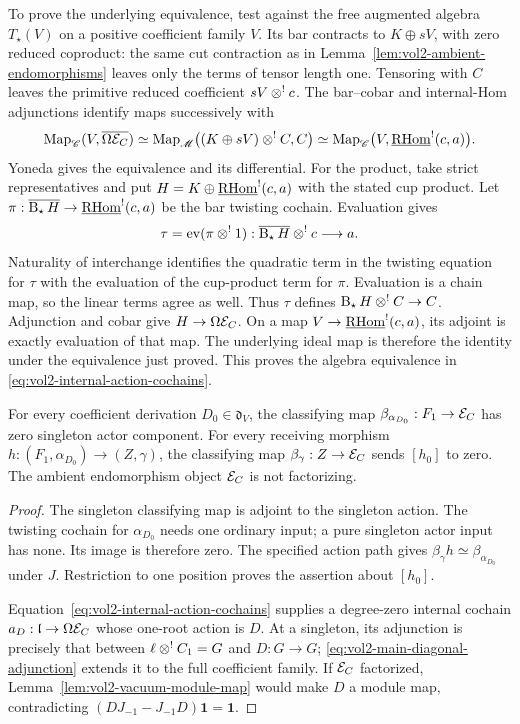 To prove the underlying equivalence, test against the free augmented
algebra $T_\star(V)$ on a positive coefficient family $V$.
Its bar contracts to $K\oplus sV$, with zero reduced coproduct:
the same cut contraction as in
Lemma~\ref{lem:vol2-ambient-endomorphisms} leaves only the
terms of tensor length one. Tensoring with $C$ leaves the primitive reduced
coefficient $sV\mathbin{\otimes^!} c$. The bar--cobar and internal-Hom
adjunctions identify maps successively with
\[
 \operatorname{Map}_{\mathscr C}(V,\overline{\Omega\mathcal E_C})
 \simeq\operatorname{Map}_{\mathscr M}\bigl((K\oplus sV)\mathbin{\otimes^!} C,C\bigr)
 \simeq\operatorname{Map}_{\mathscr C}\bigl(V,
                    \underline{\operatorname{RHom}}^{!}(c,a)\bigr).
\]
Yoneda gives the equivalence and its differential.
For the product, take strict representatives and put
$H=K\oplus\underline{\operatorname{RHom}}^{!}(c,a)$ with the stated cup product.
Let $\pi:\overline{\operatorname{B}_{\star} H}\to\underline{\operatorname{RHom}}^{!}(c,a)$ be the
bar twisting cochain. Evaluation gives
\[
 \tau=\operatorname{ev}(\pi\mathbin{\otimes^!}1):
                 \overline{\operatorname{B}_{\star} H}\mathbin{\otimes^!} c\longrightarrow a.
\]
Naturality of interchange identifies the quadratic term in the
twisting equation for $\tau$ with the evaluation of the cup-product
term for $\pi$. Evaluation is a chain map, so the linear terms
agree as well. Thus $\tau$ defines $\operatorname{B}_{\star} H\mathbin{\otimes^!} C\to C$.
Adjunction and cobar give $H\to\Omega\mathcal E_C$.
On a map $V\to\underline{\operatorname{RHom}}^{!}(c,a)$, its adjoint is exactly
evaluation of that map. The underlying ideal map is therefore
the identity under the equivalence just proved. This proves the
algebra equivalence in \eqref{eq:vol2-internal-action-cochains}.

\begin{proposition}\label{prop:vol2-ambient-kills-singleton}
For every coefficient derivation $D_0\in\mathfrak d_V$, the
classifying map $\beta_{\alpha_{D_0}}:F_1\to\mathcal E_C$ has zero
singleton actor component. For every receiving morphism
$h:(F_1,\alpha_{D_0})\to(Z,\gamma)$, the classifying map
$\beta_\gamma:Z\to\mathcal E_C$ sends $[h_0]$ to zero.
The ambient endomorphism object $\mathcal E_C$ is not factorizing.
\end{proposition}

\begin{proof}
The singleton classifying map is adjoint to the singleton action.
The twisting cochain for $\alpha_{D_0}$ needs one ordinary input;
a pure singleton actor input has none. Its image is therefore
zero. The specified action path gives
$\beta_\gamma h\simeq\beta_{\alpha_{D_0}}$ under $J$.
Restriction to one position proves the assertion about $[h_0]$.

Equation~\eqref{eq:vol2-internal-action-cochains} supplies a
degree-zero internal cochain $a_D:\mathfrak l\to\Omega\mathcal E_C$
whose one-root action is $D$.
At a singleton, its adjunction is precisely that between
$\ell\mathbin{\otimes^!} C_1=G$ and $D:G\to G$;
\eqref{eq:vol2-main-diagonal-adjunction} extends it to the full
coefficient family. If $\mathcal E_C$ factorized,
Lemma~\ref{lem:vol2-vacuum-module-map} would make $D$ a module
map, contradicting $(DJ_{-1}-J_{-1}D)\mathbf1=\mathbf1$.
\end{proof}

